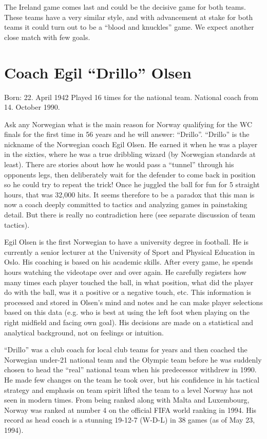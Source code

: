 The Ireland game comes last and could be the decisive game for both teams. 
These teams have a very similar style, and with advancement at stake for both 
teams it could turn out to be a ``blood and knuckles'' game. We expect another 
close match with few goals.
\section{Coach Egil ``Drillo'' Olsen}
Born: 22. April 1942
Played 16 times for the national team.
National coach from 14. October 1990.

Ask any Norwegian what is the main reason for Norway qualifying for the WC 
finals for the first time in 56 years and he will answer: ``Drillo''. ``Drillo'' 
is the nickname of the Norwegian coach Egil Olsen. He earned it when he was a 
player in the sixties, where he was a true dribbling wizard (by Norwegian 
standards at least). There are stories about how he would pass a ``tunnel'' 
through his opponents legs, then deliberately wait for the defender to come 
back in position so he could try to repeat the trick! Once he juggled the ball 
for fun for 5 straight hours, that was 32,000 hits. It seems therefore to be a 
paradox that this man is now a coach deeply committed to tactics and analyzing 
games in painstaking detail. But there is really no contradiction here (see 
separate discussion of team tactics).

Egil Olsen is the first Norwegian to have a university degree in football. He 
is currently a senior lecturer at the University of Sport and Physical 
Education in Oslo. His coaching is based on his academic skills. After every 
game, he spends hours watching the videotape over and over again. He carefully 
registers how many times each player touched the ball, in what position, what 
did the player do with the ball, was it a positive or a negative touch, etc.
This information is processed and stored in Olsen's mind and notes and he can 
make player selections based on this data (e.g. who is best at using the left 
foot when playing on the right midfield and facing own goal). His decisions are 
made on a statistical and analytical background, not on feelings or intuition.

``Drillo'' was a club coach for local club teams for years and then coached the 
Norwegian under-21 national team and the Olympic team before he was suddenly 
chosen to head the ``real'' national team when his predecessor withdrew in 1990. 
He made few changes on the team he took over, but his confidence in his 
tactical strategy and emphasis on team spirit lifted the team to a level Norway 
has not seen in modern times. From being ranked along with Malta and Luxembourg, 
Norway was ranked at number 4 on the official FIFA world ranking in 1994. His 
record as head coach is a stunning 19-12-7 (W-D-L) in 38 games (as of May 23, 
1994).

